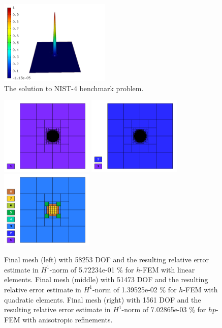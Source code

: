 \documentclass[12pt]{elsarticle}
\begin{document}
\begin{figure}[!ht]
\centering
\includegraphics[height=4cm]{nist/nist-4/solution.png}
\caption{The solution to NIST-4 benchmark problem.}
\label{fig:sln-nist04}
\end{figure}

\begin{figure}[!ht]
\centering
\includegraphics[height=3.7cm]{nist/nist-4/mesh_h1_aniso.png}
\includegraphics[height=3.7cm]{nist/nist-4/mesh_h2_aniso.png}
\includegraphics[height=3.7cm]{nist/nist-4/mesh_hp_aniso.png}
\caption{
Final mesh (left) with 58253 DOF and the resulting
relative error estimate in $H^1$-norm of 5.72234e-01 \% for $h$-FEM with linear elements.
Final mesh (middle) with 51473 DOF and the resulting
relative error estimate in $H^1$-norm of 1.39525e-02 \% for $h$-FEM with quadratic elements.
Final mesh (right) with 1561 DOF and the resulting
relative error estimate in $H^1$-norm of 7.02865e-03 \% for $hp$-FEM with anisotropic refinements.}
\label{fig:nist-4-hp-aniso}
\end{figure}
\end{document}
